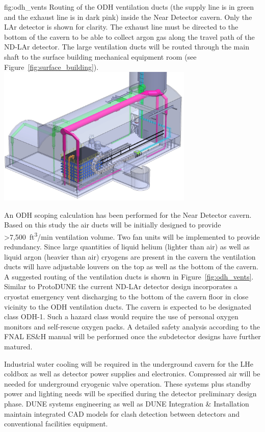 \begin{dunefigure}{fig:odh_vents}
{Routing of the ODH ventilation ducts (the supply line is in green and the exhaust line is in dark pink) inside the Near Detector cavern. Only the LAr detector is shown for clarity. The exhaust line must be directed to the bottom of the cavern to be able to collect argon gas along the travel path of the ND-LAr detector. The large ventilation ducts will be routed through the main shaft to the surface building mechanical equipment room (see Figure~\ref{fig:surface_building}).}
\includegraphics[width=0.7\textwidth]{graphics/i-and-i/odh_vents}
\end{dunefigure}

An ODH scoping calculation has been performed for the Near Detector cavern. Based on this study the air ducts will be  initially designed to provide >7,500~ft\textsuperscript{3}/min ventilation volume. Two fan units will be implemented to provide redundancy. Since large quantities of liquid helium (lighter than air) as well as liquid argon (heavier than air) cryogens are present in the cavern the ventilation ducts will have adjustable louvers on the top as well as the bottom of the cavern. A suggested routing of the ventilation ducts is shown in Figure~\ref{fig:odh_vents}. Similar to ProtoDUNE the current ND-LAr detector design incorporates a cryostat emergency vent discharging to the bottom of the cavern floor in close vicinity to the ODH ventilation ducts. The cavern is expected to be designated class ODH-1. Such a hazard class would require the use of personal oxygen monitors and self-rescue oxygen packs. A detailed safety analysis according to the FNAL ES\&H manual will be performed once the subdetector designs have further matured.

Industrial water cooling will be required in the underground cavern for the LHe coldbox as well as detector power supplies and electronics. Compressed air will be needed for underground cryogenic valve operation. These systems plus standby power and lighting needs will be specified during the detector preliminary design phase. DUNE systems engineering as well as DUNE Integration \& Installation maintain integrated CAD models for clash detection between detectors and conventional facilities equipment.



